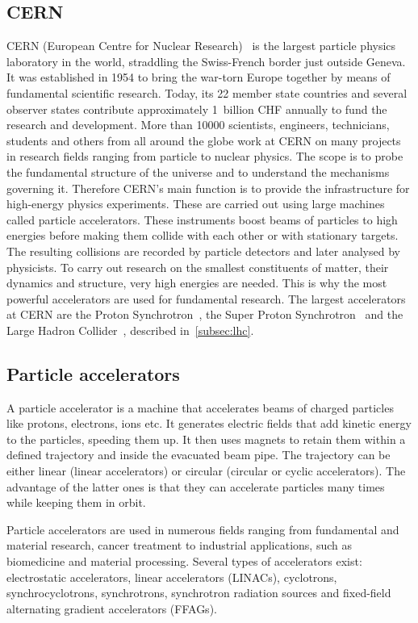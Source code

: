 \subsection{CERN}
CERN (European Centre for Nuclear Research)~\cite{CERN:00000} is the largest particle physics laboratory in the world, straddling the Swiss-French border just outside Geneva. It was established in 1954 to bring the war-torn Europe together by means of fundamental scientific research. Today, its 22 member state countries and several observer states contribute approximately 1~billion CHF annually to fund the research and development. More than 10000 scientists, engineers, technicians, students and others from all around the globe work at CERN on many projects in research fields ranging from particle to nuclear physics. The scope is to probe the fundamental structure of the universe and to understand the mechanisms governing it. Therefore CERN's main function is to provide the infrastructure for high-energy physics experiments. These are carried out using large machines called particle accelerators. These instruments boost beams of particles to high energies before making them collide with each other or with stationary targets. The resulting collisions are recorded by particle detectors and later analysed by physicists. To carry out research on the smallest constituents of matter, their dynamics and structure, very high energies are needed. This is why the most powerful accelerators are used for fundamental research. The largest accelerators at CERN are the Proton Synchrotron~\cite{}, the Super Proton Synchrotron~\cite{Mills:133232} and the Large Hadron Collider~\cite{}, described in~\ref{subsec:lhc}.

\subsection{Particle accelerators}
A particle accelerator is a machine that accelerates beams of charged particles like protons, electrons, ions etc. It generates electric fields that add kinetic energy to the particles, speeding them up. It then uses magnets to retain them within a defined trajectory and inside the evacuated beam pipe. The trajectory can be either linear (linear accelerators) or circular (circular or cyclic accelerators). The advantage of the latter ones is that they can accelerate particles many times while keeping them in orbit.

Particle accelerators are used in numerous fields ranging from fundamental and material research, cancer treatment to industrial applications, such as biomedicine and material processing. Several types of accelerators exist: electrostatic accelerators, linear accelerators (LINACs), cyclotrons, synchrocyclotrons, synchrotrons, synchrotron radiation sources and fixed-field alternating gradient accelerators (FFAGs).


